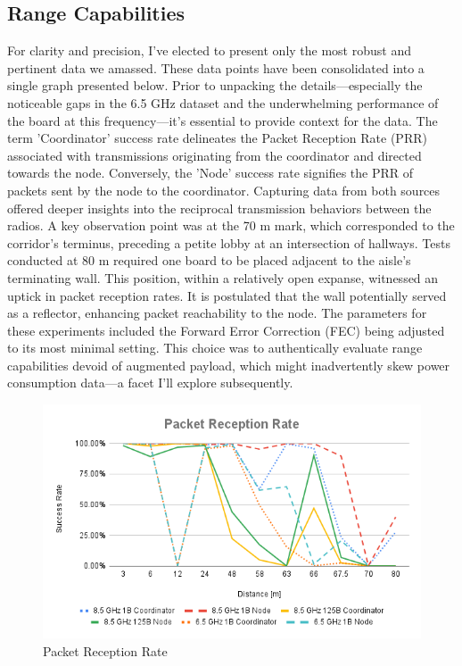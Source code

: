 \subsection{Range Capabilities}
For clarity and precision, I've elected to present only the most robust and pertinent data we amassed. These data points have been consolidated into a single graph presented below. Prior to unpacking the details—especially the noticeable gaps in the 6.5 GHz dataset and the underwhelming performance of the board at this frequency—it's essential to provide context for the data. 
The term 'Coordinator' success rate delineates the Packet Reception Rate (PRR) associated with transmissions originating from the coordinator and directed towards the node. Conversely, the 'Node' success rate signifies the PRR of packets sent by the node to the coordinator. Capturing data from both sources offered deeper insights into the reciprocal transmission behaviors between the radios.
A key observation point was at the 70 m mark, which corresponded to the corridor's terminus, preceding a petite lobby at an intersection of hallways. Tests conducted at 80 m required one board to be placed adjacent to the aisle's terminating wall. This position, within a relatively open expanse, witnessed an uptick in packet reception rates. It is postulated that the wall potentially served as a reflector, enhancing packet reachability to the node. The parameters for these experiments included the Forward Error Correction (FEC) being adjusted to its most minimal setting. This choice was to authentically evaluate range capabilities devoid of augmented payload, which might inadvertently skew power consumption data—a facet I'll explore subsequently.

\begin{figure}[h]
\centering
\includegraphics[width=\textwidth]{images/Packet Reception Rate.png}
\caption{Packet Reception Rate}
\label{fig:packet_reception_rate}
\end{figure}


